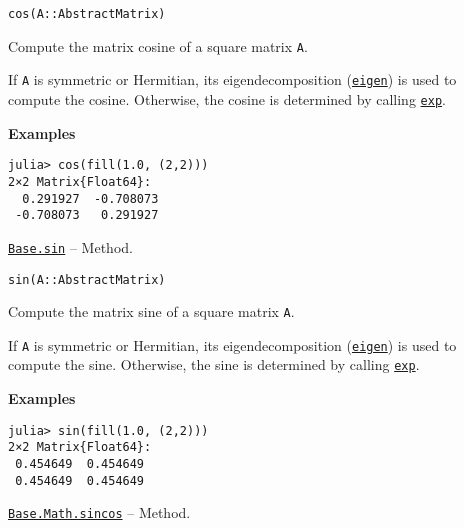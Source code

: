 \begin{adjustwidth}{2em}{0pt}


\begin{verbatim}
cos(A::AbstractMatrix)
\end{verbatim}

Compute the matrix cosine of a square matrix \texttt{A}.

If \texttt{A} is symmetric or Hermitian, its eigendecomposition (\hyperlink{11056016707394839114}{\texttt{eigen}}) is used to compute the cosine. Otherwise, the cosine is determined by calling \hyperlink{5801729597955756107}{\texttt{exp}}.

\textbf{Examples}


\begin{verbatim}
julia> cos(fill(1.0, (2,2)))
2×2 Matrix{Float64}:
  0.291927  -0.708073
 -0.708073   0.291927
\end{verbatim}



\end{adjustwidth}
\hypertarget{16209222116761399172}{}
\hyperlink{16209222116761399172}{\texttt{Base.sin}}  -- {Method.}

\begin{adjustwidth}{2em}{0pt}


\begin{verbatim}
sin(A::AbstractMatrix)
\end{verbatim}

Compute the matrix sine of a square matrix \texttt{A}.

If \texttt{A} is symmetric or Hermitian, its eigendecomposition (\hyperlink{11056016707394839114}{\texttt{eigen}}) is used to compute the sine. Otherwise, the sine is determined by calling \hyperlink{5801729597955756107}{\texttt{exp}}.

\textbf{Examples}


\begin{verbatim}
julia> sin(fill(1.0, (2,2)))
2×2 Matrix{Float64}:
 0.454649  0.454649
 0.454649  0.454649
\end{verbatim}



\end{adjustwidth}
\hypertarget{14680236683981002550}{}
\hyperlink{14680236683981002550}{\texttt{Base.Math.sincos}}  -- {Method.}

